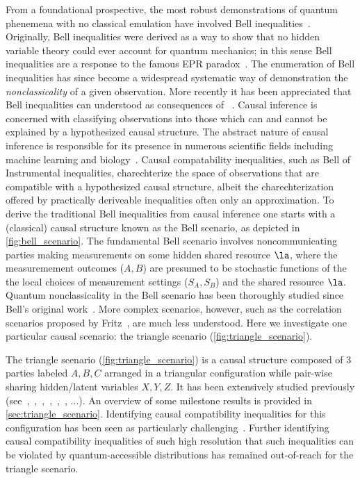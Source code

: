 \documentclass[aps, 10pt, english, twoside, pra, nofootinbib, tightenlines, longbibliography]{revtex4-1}
\begin{document}
    From a foundational prospective, the most robust demonstrations of quantum phenemena with no classical emulation have involved Bell inequalities~\cite{Bell_1964}. Originally, Bell inequalities were derived as a way to show that no hidden variable theory could ever account for quantum mechanics; in this sense Bell inequalities are a response to the famous EPR paradox~\cite{EPR_Orig}. The enumeration of Bell inequalities has since become a widespread systematic way of demonstration the \textit{nonclassicality} of a given observation. More recently it has been appreciated that Bell inequalities can understood as consequences of ~\cite{Wood_2012}. Causal inference is concerned with classifying observations into those which can and cannot be explained by a hypothesized causal structure. The abstract nature of causal inference is responsible for its presence in numerous scientific fields including machine learning and biology~\cite{Pearl_2009,Pearl_2009_tr}. Causal compatability inequalities, such as Bell of Instrumental inequalities, charechterize the space of observations that are compatible with a hypothesized causal structure, albeit the charechterization offered by practically deriveable inequalities often only an approximation. To derive the traditional Bell inequalities from causal inference one starts with a (classical) causal structure known as the Bell scenario, as depicted in \cref{fig:bell_scenario}. The fundamental Bell scenario involves noncommunicating parties making measurements on some hidden shared resource $\la$, where the measuremement outcomes ($A, B$) are presumed to be stochastic functions of the the local choices of measurement settings ($S_A, S_B$) and the shared resource $\la$. Quantum nonclassicality in the Bell scenario has been thoroughly studied since Bell's original work~\cite{Brunner_2013}. More complex scenarios, however, such as the correlation scenarios proposed by Fritz~\cite{Fritz_2012,Fritz_2014}, are much less understood. Here we investigate one particular causal scenario: the triangle scenario (\cref{fig:triangle_scenario}).

    The triangle scenario (\cref{fig:triangle_scenario}) is a causal structure composed of $3$ parties labeled $A, B, C$ arranged in a triangular configuration while pair-wise sharing hidden/latent variables $X, Y, Z$. It has been extensively studied previously (see~\cite[Fig. 1]{Steudel_2010},~\cite[Fig. 6]{Chaves_2014},~\cite[Fig. 8]{Branciard_2012},~\cite[Fig. 8, App. E]{Henson_2014},~\cite[Fig. 3]{Fritz_2012},~\cite[Fig. 1]{Inflation}, $\ldots$). An overview of some milestone results is provided in \cref{sec:triangle_scenario}. Identifying causal compatibility inequalities for this configuration has been seen as particularly challenging~\citet{Branciard_2012}. Further identifying causal compatibility inequalities of such high resolution that such inequalities can be violated by quantum-accessible distributions has remained out-of-reach for the triangle scenario.
\end{document}
